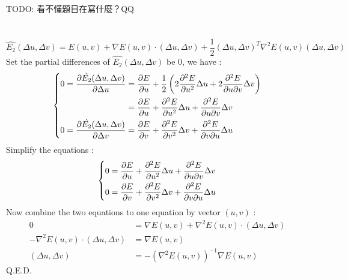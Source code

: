 \documentclass[12pt,a4paper]{article}
\begin{document}
TODO: 看不懂題目在寫什麼？QQ

\section{} %

\[
	\hat{{E}_2}(\Delta u,\Delta v)
		= E(u, v) + \nabla E(u, v) \cdot (\Delta u, \Delta v)
		+ \frac{1}{2} {(\Delta u, \Delta v)}^{T} {\nabla}^{2}E(u, v) (\Delta u, \Delta v)
\]
Set the partial differences of $\hat{{E}_2}(\Delta u,\Delta v)$ be $0$, we have :
\[
	\left\{
		\begin{aligned}
			0 = \pdv{\hat{{E}_2}(\Delta u,\Delta v)}{\Delta u}
				&= \pdv{E}{u} + \frac{1}{2}\left( 2 \pdv[2]{E}{u} \Delta u + 2 \pdv{E}{u}{v} \Delta v \right) \\
				&= \pdv{E}{u} + \pdv[2]{E}{u} \Delta u + \pdv{E}{u}{v} \Delta v \\
			0 = \pdv{\hat{{E}_2}(\Delta u,\Delta v)}{\Delta v}
				&= \pdv{E}{v} + \pdv[2]{E}{v} \Delta v + \pdv{E}{v}{u} \Delta u \\
		\end{aligned}
	\right.
\]
Simplify the equations :
\[
	\left\{
		\begin{aligned}
			0 &= \pdv{E}{u} + \pdv[2]{E}{u} \Delta u + \pdv{E}{u}{v} \Delta v \\
			0 &= \pdv{E}{v} + \pdv[2]{E}{v} \Delta v + \pdv{E}{v}{u} \Delta u \\
		\end{aligned}
	\right.
\]
Now combine the two equations to one equation by vector $(u, v)$ :
\[
	\begin{aligned}
		0 &= \nabla E(u, v) + {\nabla}^{2} E(u, v) \cdot (\Delta u, \Delta v) \\
		- {\nabla}^{2} E(u, v) \cdot (\Delta u, \Delta v) &= \nabla E(u, v) \\
		(\Delta u, \Delta v) &= - {\left({\nabla}^{2} E(u, v)\right)}^{-1} \nabla E(u, v)
	\end{aligned}
\]
Q.E.D.

\section{} %
\end{document}
